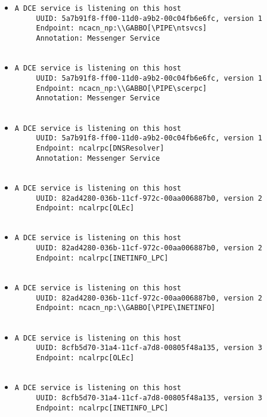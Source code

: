 \documentclass{article}
\begin{document}
\begin{itemize}
\begin{verbatim}
\end{verbatim}\item \begin{verbatim}
A DCE service is listening on this host
     UUID: 5a7b91f8-ff00-11d0-a9b2-00c04fb6e6fc, version 1
     Endpoint: ncacn_np:\\GABBO[\PIPE\ntsvcs]
     Annotation: Messenger Service


\end{verbatim}\item \begin{verbatim}
A DCE service is listening on this host
     UUID: 5a7b91f8-ff00-11d0-a9b2-00c04fb6e6fc, version 1
     Endpoint: ncacn_np:\\GABBO[\PIPE\scerpc]
     Annotation: Messenger Service


\end{verbatim}\item \begin{verbatim}
A DCE service is listening on this host
     UUID: 5a7b91f8-ff00-11d0-a9b2-00c04fb6e6fc, version 1
     Endpoint: ncalrpc[DNSResolver]
     Annotation: Messenger Service


\end{verbatim}\item \begin{verbatim}
A DCE service is listening on this host
     UUID: 82ad4280-036b-11cf-972c-00aa006887b0, version 2
     Endpoint: ncalrpc[OLEc]


\end{verbatim}\item \begin{verbatim}
A DCE service is listening on this host
     UUID: 82ad4280-036b-11cf-972c-00aa006887b0, version 2
     Endpoint: ncalrpc[INETINFO_LPC]


\end{verbatim}\item \begin{verbatim}
A DCE service is listening on this host
     UUID: 82ad4280-036b-11cf-972c-00aa006887b0, version 2
     Endpoint: ncacn_np:\\GABBO[\PIPE\INETINFO]


\end{verbatim}\item \begin{verbatim}
A DCE service is listening on this host
     UUID: 8cfb5d70-31a4-11cf-a7d8-00805f48a135, version 3
     Endpoint: ncalrpc[OLEc]


\end{verbatim}\item \begin{verbatim}
A DCE service is listening on this host
     UUID: 8cfb5d70-31a4-11cf-a7d8-00805f48a135, version 3
     Endpoint: ncalrpc[INETINFO_LPC]



\end{verbatim}
\end{itemize}
\end{document}
